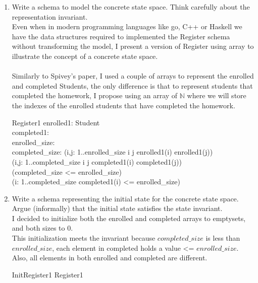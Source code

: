 \documentclass{article}
\begin{document}
\begin{enumerate}
\item Write a schema to model the concrete state space. Think
  carefully about the representation invariant.
  \color{blue}
  \\
  Even when in modern programming languages like go, C++ or Haskell we have the data structures required
  to implemented the Register schema without transforming the model, I present a version of Register using array to illustrate the concept of a concrete state space. \\
  \\
  Similarly to Spivey's paper, I used a couple of arrays to represent the enrolled and completed Students, the only difference is that to represent students that completed the homework, I propose using an array of $\mathbb{N}$ where we will store the indexes of the enrolled students that have completed the homework. \\
  \begin{schema}{Register1}
    enrolled1:   \to Student\\
    completed1:  \to {} \\
    enrolled\_size:  \\
    completed\_size: 
  \where
  (\forall i,j: 1..enrolled\_size \bullet i \neq j \implies enrolled1(i) \neq enrolled1(j)) \land \\
  (\forall i,j: 1..completed\_size  \bullet i \neq j \implies completed1(i) \neq completed1(j)) \land \\
  (completed\_size <= enrolled\_size) \land \\
  (\forall i: 1..completed\_size \bullet completed1(i) <= enrolled\_size) 
  \end{schema}
  \color{black}
\item Write a schema representing the initial state for the concrete state space. Argue (informally) that the initial state satisfies the state invariant. \\
  \color{blue}
  I decided to initialize both the enrolled and completed arrays to emptysets, and both sizes to 0. \\
  This initialization meets the invariant because $completed\_size$ is less than $enrolled\_size$, each element in completed holds a value <= $enrolled\_size$. Also, all elements in both enrolled and completed are different. \\
  \begin{schema}{InitRegister1}
    Register1

\end{schema}
\end{enumerate}
\end{document}
